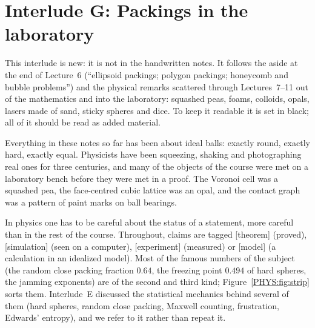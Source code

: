 
\newcommand{\PHYStag}[1]{\textsf{\scriptsize[#1]}}
\newcommand{\PHYSmth}[1]{\fill[black] #1 ++(-2.2pt,-2.2pt) rectangle ++(4.4pt,4.4pt);}
\newcommand{\PHYSmsim}[1]{\filldraw[draw=black,fill=white,thick] #1 circle (2.3pt);}
\newcommand{\PHYSmexp}[1]{\fill[flagcol] #1 ++(0pt,3.2pt) -- ++(-2.9pt,-5.2pt) -- ++(5.8pt,0pt) -- cycle;}
\newcommand{\PHYSmcon}[1]{\fill[addcol] #1 ++(0pt,3pt) -- ++(3pt,-3pt) -- ++(-3pt,-3pt) -- ++(-3pt,3pt) -- cycle;}

\chapter[Interlude G: Packings in the lab]{Interlude G: Packings in the laboratory}
\label{PHYS:ch}

\begin{addedblock}
This interlude is new: it is not in the handwritten notes. It follows the aside at the end of
Lecture~6 (``ellipsoid packings; polygon packings; honeycomb and bubble problems'') and the physical
remarks scattered through Lectures~7--11 out of the mathematics and into the laboratory: squashed peas,
foams, colloids, opals, lasers made of sand, sticky spheres and dice. To keep it readable it is set in
black; all of it should be read as added material.
\end{addedblock}

Everything in these notes so far has been about ideal balls: exactly round, exactly hard, exactly
equal. Physicists have been squeezing, shaking and photographing real ones for three centuries, and
many of the objects of the course were met on a laboratory bench before they were met in a proof. The
Voronoi cell was a squashed pea, the face-centred cubic lattice was an opal, and the contact graph was
a pattern of paint marks on ball bearings.

In physics one has to be careful about the status of a statement, more careful than in the rest of the
course. Throughout, claims are tagged \PHYStag{theorem} (proved), \PHYStag{simulation} (seen on a
computer), \PHYStag{experiment} (measured) or \PHYStag{model} (a calculation in an idealized model).
Most of the famous numbers of the subject (the random close packing fraction $0.64$, the freezing
point $0.494$ of hard spheres, the jamming exponents) are of the second and third kind; Figure~\ref{PHYS:fig:strip} sorts them. Interlude~E
discussed the statistical mechanics behind several of them (hard spheres, random close packing, Maxwell
counting, frustration, Edwards' entropy), and we refer to it rather than repeat it.

